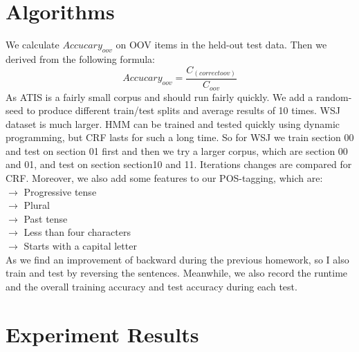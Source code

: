\documentclass[journal, a4paper]{IEEEtran}
\begin{document}
\section{Algorithms}\label{algorithm}
\vspace{3mm}
We calculate $Accucary_{oov}$ on OOV items in the held-out test data. Then we derived from the following formula:
\[
  Accucary_{oov} = \frac{C_({correct oov})}{C_{oov}}
\]
As ATIS is a fairly small corpus and should run fairly quickly. We add a random-seed to produce different train/test splits and average results of 10 times. WSJ dataset is much larger. HMM can be trained and tested quickly using dynamic programming, but CRF lasts for such a long time. So for WSJ we train section 00 and test on section 01 first and then we try a larger corpus, which are section 00 and 01, and test on section section10 and 11. Iterations changes are compared for CRF. Moreover, we also add some features to our POS-tagging, which are:\\
 $\rightarrow$ Progressive tense \\
 $\rightarrow$ Plural \\
 $\rightarrow$ Past tense \\
 $\rightarrow$ Less than four characters \\
 $\rightarrow$ Starts with a capital letter\\ 
As we find an improvement of backward during the previous homework, so I also train and test by reversing the sentences. Meanwhile, we also record the runtime and the overall training accuracy and test accuracy during each test.

\section{Experiment Results}\label{result}
\end{document}
